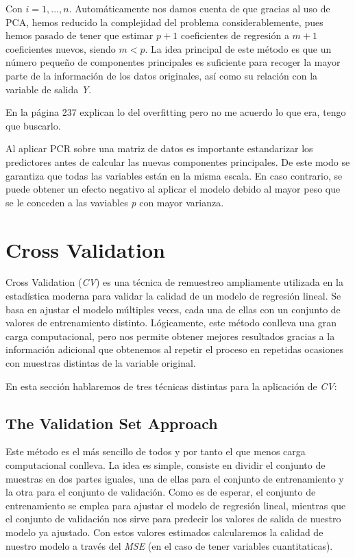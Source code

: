 \documentclass[12pt,a4paper,Spanish]{book}
\begin{document}
Con $i=1,...,n$. Automáticamente nos damos cuenta de que gracias al uso de PCA, hemos reducido la complejidad del problema considerablemente, pues hemos pasado de tener que estimar $p+1$ coeficientes de regresión a $m+1$ coeficientes nuevos, siendo $m<p$. La idea principal de este método es que un número pequeño de componentes principales es suficiente para recoger la mayor parte de la información de los datos originales, así como su relación con la variable de salida \textit{Y}.

En la página 237 explican lo del overfitting pero no me acuerdo lo que era, tengo que buscarlo.

Al aplicar PCR sobre una matriz de datos es importante estandarizar los predictores antes de calcular las nuevas componentes principales. De este modo se garantiza que todas las variables están en la misma escala. En caso contrario, se puede obtener un efecto negativo al aplicar el modelo debido al mayor peso que se le conceden a las vaviables \textit{p} con mayor varianza.

\section{Cross Validation}

Cross Validation (\textit{CV}) es una técnica de remuestreo ampliamente utilizada en la estadística moderna para validar la calidad de un modelo de regresión lineal. Se basa en ajustar el modelo múltiples veces, cada una de ellas con un conjunto de valores de entrenamiento distinto. Lógicamente, este método conlleva una gran carga computacional, pero nos permite obtener mejores resultados gracias a la información adicional que obtenemos al repetir el proceso en repetidas ocasiones con muestras distintas de la variable original.


En esta sección hablaremos de tres técnicas distintas para la aplicación de \textit{CV}:

\subsection{The Validation Set Approach}

Este método es el más sencillo de todos y por tanto el que menos carga computacional conlleva. La idea es simple, consiste en dividir el conjunto de muestras en dos partes iguales, una de ellas para el conjunto de entrenamiento y la otra para el conjunto de validación. Como es de esperar, el conjunto de entrenamiento se emplea para ajustar el modelo de regresión lineal, mientras que el conjunto de validación nos sirve para predecir los valores de salida de nuestro modelo ya ajustado. Con estos valores estimados calcularemos la calidad de nuestro modelo a través del \textit{MSE} (en el caso de tener variables cuantitaticas).
\end{document}
